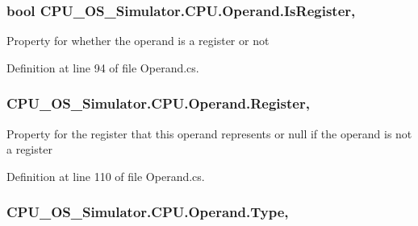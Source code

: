 \subsubsection[{Is\+Register}]{\setlength{\rightskip}{0pt plus 5cm}bool C\+P\+U\+\_\+\+O\+S\+\_\+\+Simulator.\+C\+P\+U.\+Operand.\+Is\+Register\hspace{0.3cm}{\ttfamily [get]}, {\ttfamily [set]}}\label{class_c_p_u___o_s___simulator_1_1_c_p_u_1_1_operand_a662aacb6eb1aa9cf818181aea695e0c9}


Property for whether the operand is a register or not 



Definition at line 94 of file Operand.\+cs.

\hypertarget{class_c_p_u___o_s___simulator_1_1_c_p_u_1_1_operand_a8f08360f0e27922fc0377f5d58a9e67f}{}
\subsubsection[{Register}]{ C\+P\+U\+\_\+\+O\+S\+\_\+\+Simulator.\+C\+P\+U.\+Operand.\+Register\hspace{0.3cm}{\ttfamily [get]}, {\ttfamily [set]}}\label{class_c_p_u___o_s___simulator_1_1_c_p_u_1_1_operand_a8f08360f0e27922fc0377f5d58a9e67f}


Property for the register that this operand represents or null if the operand is not a register 



Definition at line 110 of file Operand.\+cs.

\hypertarget{class_c_p_u___o_s___simulator_1_1_c_p_u_1_1_operand_a0b0deae57b760df3a083dc54535b0891}{}
\subsubsection[{Type}]{ C\+P\+U\+\_\+\+O\+S\+\_\+\+Simulator.\+C\+P\+U.\+Operand.\+Type\hspace{0.3cm}{\ttfamily [get]}, {\ttfamily [set]}}\label{class_c_p_u___o_s___simulator_1_1_c_p_u_1_1_operand_a0b0deae57b760df3a083dc54535b0891}


